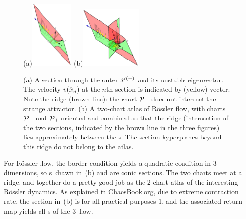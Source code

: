 \documentclass[aip,cha,reprint,
secnumarabic,
nofootinbib, tightenlines,
nobibnotes, showkeys, showpacs,
groupedaddress
]{revtex4-1}
\begin{document}
\begin{figure}%
\begin{center}
(a)\includegraphics[width=0.19\textwidth,clip=true]{RoessFarEq3}%
(b)\includegraphics[width=0.27\textwidth,clip=true]{RoessSctAtlas3}
\end{center}
  \caption[R\"ossler section, outer {\eqv}]{
(a)
  A section through the outer {\eqv} ${\hat{x}'}{}^{(+)}$  and its unstable
  eigenvector. The velocity $v(\hat{x}_n)$ at the $n$th section is
  indicated by (yellow) vector. Note the ridge (brown line): the chart ${\cal P}_{+}$
  does not intersect the strange attractor.
(b)
  A two-chart atlas of R\"ossler flow, with charts ${\cal P}_{-}$ and
  ${\cal P}_{+}$ oriented and combined so that the ridge (intersection of
  the two sections, indicated by the brown line in the three figures) lies
  approximately between the \template s. The section hyperplanes
  beyond this ridge do not belong to the atlas.
  } \label{fig:RoessFarEq}
\end{figure}

For R\"ossler flow, the border condition  yields a
quadratic condition in 3 dimensions, so \poincBord s\ drawn in
\,(b) and  are conic
sections. The two charts meet at a ridge, and together do a pretty good
job as the 2-chart atlas of the interesting R\"ossler dynamics. As
explained in ChaosBook.org, due to extreme contraction rate,
the section in \,(b) is for all practical purposes
1\dmn, and the associated return map yields all \po s of the 3\dmn\ flow.
\end{document}
